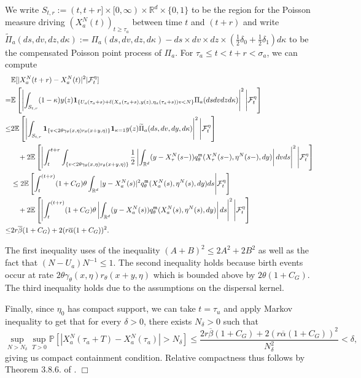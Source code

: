 \documentclass[12pt]{article}
\newenvironment {proof}{{\noindent\bf Proof }}{\hfill $\Box$ \medskip}
\def \tilde{\widetilde}
\newcommand{\IR}{\mathbb R}
\newcommand{\ind}{\mathbf{1}}
\begin{document}
\begin{proof}
We write $S_{t,r}:=(t,t+r  ]\times [0,\infty )\times \IR^d\times 
\{0,1\}$ to be the region for the Poisson measure driving $(X^{N}_{a}(t))_{t \geq \tau_a}$ between time $t$ and $(t+r)$ and write $\tilde\Pi_{a}(ds,dv,dz,d\kappa):=\Pi_{a}(ds,dv,dz, d\kappa) - ds\times dv\times dz \times (\frac{1}{2}\delta_{0}+\frac{1}{2}\delta_{1})d\kappa$ to be the compensated Poisson point process of $\Pi_{a}$. 
For $\tau_a \leq t < t+r < \sigma_a$, we can compute
\small
\begin{align*}
&\mathbb{E}[|X^{N}_{a}(t+r )-X^{N}_{a}(t)|^2|{\cal F}_t^{
\eta}]\\
=& \mathbb{E}\left[\left|
\int_{S_{t,r}}
(1-\kappa)y(z)
\ind_{ \{
        U_{a}(\tau_{a}+s)
        + \ell(X_{a}(\tau_{a}+s),y(z),\eta_{a}(\tau_{a}+s)) v < N
        \}
      } 
\Pi_{a}(dsdvdzd\kappa)
\right|^2
\Bigg|{\cal F}_t^{\eta}\right]\\
\leq&
 2\mathbb{E}\left[
 \left|
 \int_{S_{t,r}}
 {\bf 1}_{\{v < 2  \theta \gamma_{\theta}(x, \eta) r_{\theta}(x + y, \eta) \}}{\bf 1}_{\kappa =1}
y(z)
\tilde\Pi_{a}(ds,dv,dy,d\kappa )
\right|^2
\Bigg|{\cal F}_t^{\eta}
\right]\\
&\quad +2\mathbb{E}\left[
\left|
\int_{t}^{t+r}\int_{\{v < 2\theta \gamma_{\theta}(x, \eta) r_{\theta}(x + y, \eta) \}}
\frac{1}{2}\left| \int_{\IR^d} (y-X^{N}_{\tau}(s-)) q^{\mathfrak{m}}_{\theta}(X^{N}_{\tau}(s-),\eta^{N}(s-),dy) 
\right|
dvds \right|^2
\Bigg|{\cal F}_t^{\eta}
\right]\\
&\leq 
2\mathbb{E}\left[
\int_{t}^{(t+r)   }
(1+C_G) \theta 
\int_{{\IR}^d}|y-X^{N}_{
a}(s)|^2q^{\mathfrak{m}}_{\theta}(X^{N}_{a}(s),\eta^{N}(s),dy)ds
\Bigg|{\cal F}_t^{\eta}\right]\\
&\quad +2\mathbb{E}\left[
\left|
\int_{t}^{(t+r)}
(1+C_G)\theta 
\left|
\int_{{\IR}^d}
(y-X^{N}_{a}(s))q^{\mathfrak{m}}_{\theta}(X^{N}_{a}(s),
\eta^{N}(s),dy)
\right|
ds
\right|^2
\Bigg|{\cal F}_t^{\eta}\right]\\
\leq& 2r \overline{\beta}(1+C_G)+2(r \overline{\alpha}(1+C_G))^2.
\end{align*}
\normalsize

The first inequality uses of the inequality $(A+B)^2 \leq 2A^2+2B^2$ as well as the fact that $(N-U_{a})N^{-1} \leq 1$.
The second inequality holds 
because birth events occur
at rate $2\theta \gamma_{\theta}(x, \eta) r_{\theta}(x + y, \eta)$
which is bounded above by $2\theta (1+C_G)$. The third inequality holds due to the assumptions on the dispersal kernel.

Finally, since $\eta_0$ has compact support, we can take $t=\tau_u$ and apply Markov inequality to get that for every $\delta>0$, there exists $N_{\delta}>0$ such that
\begin{equation}\label{eq: Compact Containment Condition for individual spatial motion}
\sup_{N>N_{\delta}}\sup_{T>0}\mathbb{P}\left[|X^{N}_{a}(\tau_{a}+T)-X^{N}_{a}(\tau_{a})|>N_{\delta}\right]\leq   \frac{2r \overline{\beta}(1+C_G)+2(r \overline{\alpha}(1+C_G))^2}{N_{\delta}^2}  < \delta,
\end{equation}
giving us compact containment condition. Relative compactness thus follows by Theorem 3.8.6.
of \cite{ethier/kurtz:1986}.
\end{proof}
\end{document}
